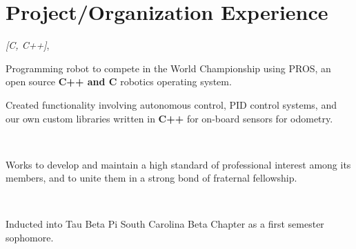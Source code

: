 \documentclass[letterpaper]{deedy-resume}
\begin{document}
\begin{minipage}[t]{0.69\textwidth}
\sectionspace 

\section{Project/Organization Experience}

 \emph{[C, C++]}, \\
\begin{tightitemize}
\item Programming robot to compete in the World Championship using PROS, an open source \textbf{C++ and C} robotics operating system. 
\item Created functionality involving autonomous control, PID control systems, and our own custom libraries written in \textbf{C++} for on-board sensors for odometry.
\end{tightitemize}
\sectionspace 

 \\
\begin{tightitemize}
\item Works to develop and maintain a high standard of professional interest among its members, and to unite them in a strong bond of fraternal fellowship. 
\end{tightitemize}
\sectionspace 

  \\
\begin{tightitemize}
\item Inducted into Tau Beta Pi South Carolina Beta Chapter as a first semester sophomore.
\end{tightitemize}
\sectionspace 

\end{minipage}
\end{document}
